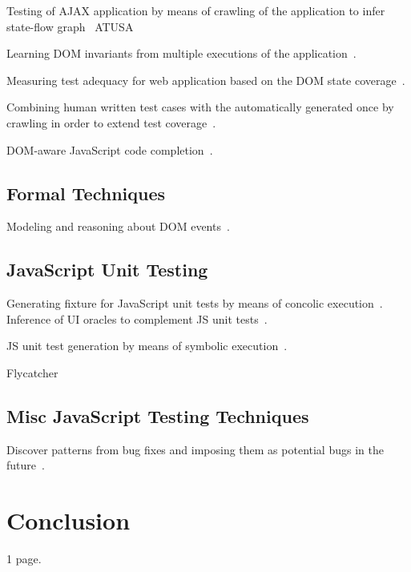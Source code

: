 \documentclass[sigconf]{acmart}
\begin{document}
Testing of AJAX application by means of crawling of the application to infer state-flow graph~\cite{mesbah2012crawling} ATUSA ~\cite{mesbah2012invariant}

Learning DOM invariants from multiple executions of the application~\cite{pattabiraman2010dodom}.

Measuring test adequacy for web application based on the DOM state coverage~\cite{mirzaaghaei2014dom}.

Combining human written test cases with the automatically generated once by crawling in order to extend test coverage~\cite{milani2014leveraging}.

DOM-aware JavaScript code completion~\cite{bajaj2014dompletion}. 

\subsection{Formal Techniques}
\label{sub.sec.formal}

Modeling and reasoning about DOM events~\cite{lerner2012modeling}.

\subsection{JavaScript Unit Testing}
\label{sub.sec.js.unit.test}

Generating fixture for JavaScript unit tests by means of concolic execution~\cite{amin:ase15}. Inference of UI oracles to complement JS unit tests~\cite{icst16}.

JS unit test generation by means of symbolic execution~\cite{tanida2014automatic}.

Flycatcher~\cite{deautomatic}

\subsection{Misc JavaScript Testing Techniques}
\label{sub.sec.misc.test.tech}

Discover patterns from bug fixes and imposing them as potential bugs in the future~\cite{quinn:fse16}. 

\section{Conclusion}
\label{sec:concl}
1 page.


 
\end{document}
